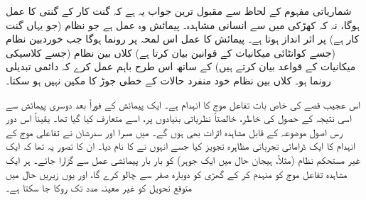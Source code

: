 شماریاتی مفہوم کے لحاظ سے مقبول ترین جواب یہ ہے کہ گنت کار کے گنتی کا عمل  ہوگا، نہ کہ کھڑکی میں سے انسانی مشاہدہ۔ پیمائش وہ عمل ہے جو  نظام (جو یہاں گنت کار ہے) پر اثر انداز ہوتا ہے۔ پیمائش کا عمل اس لمحہ پر رونما ہوگا جب خوردبین نظام (جسے کوانٹائی میکانیات کے قوانین بیان کرتا ہے) کلاں بین نظام (جسے کلاسیکی میکانیات کے قواعد بیان کرتے ہیں) کے ساتھ اس طرح باہم عمل کرے کہ دائمی تبدیلی رونما ہو۔ کلاں بین نظام خود منفرد حالات کے خطی جوڑ کا مکین نہیں ہو سکتا۔

اس عجیب قصے کی خاص بات تفاعل موج کا انہدام ہے۔ ایک پیمائش کے فوراً بعد دوسری پیمائش سے اسی نتیجہ کے حصول کی خاطر، خالصتاً نظریاتی بنیادوں پر، اسے متعارف کیا گیا تھا۔ یقیناً اس دور رس اصول موضوعہ کے قابل مشاہدہ اثرات بھی ہوں گے۔  میں مسرا اور سدرشان نے تفاعلی موج کے انہدام کا ایک ڈرامائی تجرباتی مظاہرہ تجویز کیا جسے انہوں نے  کا نام دیا۔ ان کا تصور یہ تھا کہ ایک غیر مستحکم نظام (مثلاً، ہیجان حال میں ایک جوہر) کو بار بار پیمائشی عمل سے گزارا جائے۔ ہر ایک مشاہدہ تفاعل موج کو منہدم کر کے گھڑی کو دوبارہ صفر سے چالو کرے گا، اور یوں زیریں حال میں متوقع تحویل کو غیر معینہ مدد تک روکا جا سکتا ہے۔

